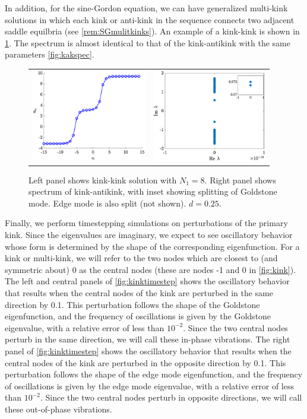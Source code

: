 \documentclass[12pt,reqno]{amsart}
\def\noi{\noindent}
\begin{document}
\noi In addition, for the sine-Gordon equation, we can have generalized multi-kink solutions in which each kink or anti-kink in the sequence connects two adjacent saddle equilbria (see \cref{rem:SGmulitkinks}). An example of a kink-kink is shown in \cref{fig:kk50}. The spectrum is almost identical to that of the kink-antikink with the same parameters \cref{fig:kakspec}.
\begin{figure}[H]
	\begin{center}
	\begin{tabular}{cc}
	\includegraphics[width=5cm]{kk50.eps} &
	\includegraphics[width=5cm]{kk50spec.eps}
	\end{tabular}
	\end{center}
	\caption{Left panel shows kink-kink solution with $N_1 = 8$. Right panel shows spectrum of kink-antikink, with inset showing splitting of Goldstone mode. Edge mode is also split (not shown). $d = 0.25$. }
	\label{fig:kk50}
\end{figure}

Finally, we perform timestepping simulations on perturbations of the primary kink. Since the eigenvalues are imaginary, we expect to see oscillatory behavior whose form is determined by the shape of the corresponding eigenfunction. For a kink or multi-kink, we will refer to the two nodes which are closest to (and symmetric about) 0 as the central nodes (these are nodes -1 and 0 in \cref{fig:kink}). The left and central panels of \cref{fig:kinktimestep} shows the oscillatory behavior that results when the central nodes of the kink are perturbed in the same direction by 0.1. This perturbation follows the shape of the Goldstone eigenfunction, and the frequency of oscillations is given by the Goldstone eigenvalue, with a relative error of less than $10^{-2}$. Since the two central nodes perturb in the same direction, we will call these in-phase vibrations. The right panel of \cref{fig:kinktimestep} shows the oscillatory behavior that results when the central nodes of the kink are perturbed in the opposite direction by 0.1. This perturbation follows the shape of the edge mode eigenfunction, and the frequency of oscillations is given by the edge mode eigenvalue, with a relative error of less than $10^{-2}$. Since the two central nodes perturb in opposite directions, we will call these out-of-phase vibrations.
\end{document}
